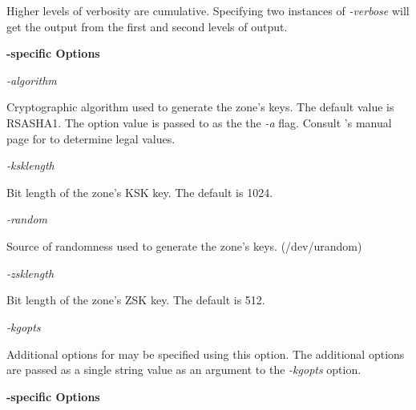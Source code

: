 \begin{description}
Higher levels of verbosity are cumulative.  Specifying two instances of
{\it -verbose} will get the output from the first and second levels of output.

\end{description}

{\bf {}-specific Options}

\begin{description}

\item {\it -algorithm}\verb" "

Cryptographic algorithm used to generate the zone's keys.  The default value
is RSASHA1.  The option value is passed to  as the the {\it
-a} flag.  Consult 's manual page for to determine legal
values.

\item {\it -ksklength}\verb" "

Bit length of the zone's KSK key.
The default is 1024.

\item {\it -random}\verb" "

Source of randomness used to generate the zone's keys.	(/dev/urandom)

\item {\it -zsklength}\verb" "

Bit length of the zone's ZSK key.
The default is 512.

\item {\it -kgopts}\verb" "

Additional options for  may be specified using this option.
The additional options are passed as a single string value as an argument to
the {\it -kgopts} option.

\end{description}

{\bf {}-specific Options}


